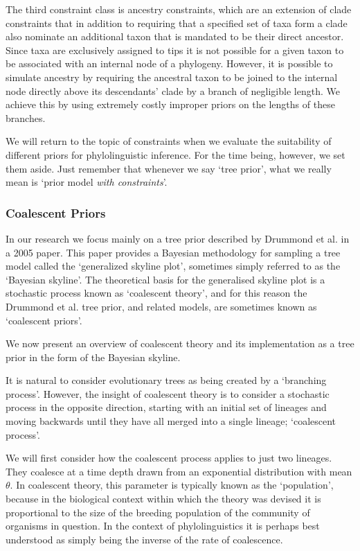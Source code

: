 \documentclass[10pt,journal,compsoc]{IEEEtran}
\begin{document}
The third constraint class is ancestry constraints, which are an extension of clade constraints that in addition to requiring that a specified set of taxa form a clade also nominate an additional taxon that is mandated to be their direct ancestor. Since taxa are exclusively assigned to tips it is not possible for a given taxon to be associated with an internal node of a phylogeny. However, it is possible to simulate ancestry by requiring the ancestral taxon to be joined to the internal node directly above its descendants' clade by a branch of negligible length. We achieve this by using extremely costly improper priors on the lengths of these branches.

We will return to the topic of constraints when we evaluate the suitability of different priors for phylolinguistic inference. For the time being, however, we set them aside. Just remember that whenever we say `tree prior', what we really mean is `prior model \textit{with constraints}'.

\subsubsection{Coalescent Priors}

In our research we focus mainly on a tree prior described by Drummond et al. in a 2005 paper. This paper provides a Bayesian methodology for sampling a tree model called the `generalized skyline plot', sometimes simply referred to as the `Bayesian skyline'. The theoretical basis for the generalised skyline plot is a stochastic process known as `coalescent theory', and for this reason the Drummond et al. tree prior, and related models, are sometimes known as `coalescent priors'\cite{drummond2005bayesian}.

We now present an overview of coalescent theory and its implementation as a tree prior in the form of the Bayesian skyline.

It is natural to consider evolutionary trees as being created by a `branching process'. However, the insight of coalescent theory is to consider a stochastic process in the opposite direction, starting with an initial set of lineages and moving backwards until they have all merged into a single lineage;  `coalescent process'.

We will first consider how the coalescent process applies to just two lineages. They coalesce at a time depth drawn from an exponential distribution with mean $\theta$. In coalescent theory, this parameter is typically known as the `population', because in the biological context within which the theory was devised it is proportional to the size of the breeding population of the community of organisms in question. In the context of phylolinguistics it is perhaps best understood as simply being the inverse of the rate of coalescence.
\end{document}
